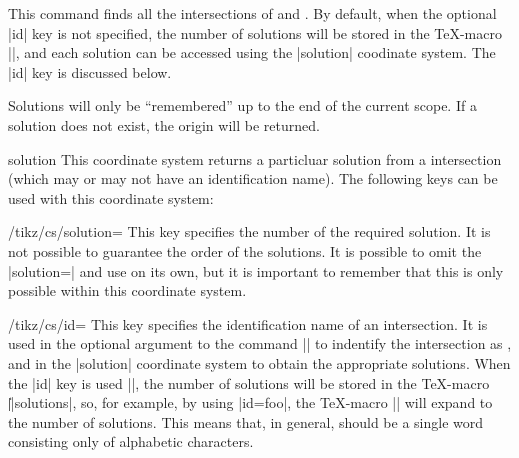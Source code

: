 \begin{command}{\tikzintersectnamedpaths\opt{|[id=|\meta{name}|]|}}
  
  This command finds all the intersections of  and 
  . By default, when the optional |id| key is not 
  specified, the number of solutions will be stored in the 
  \TeX-macro |\solutions|, and each solution can be accessed 
  using the |solution| coodinate system. The |id| key is
  discussed below.
  
  Solutions will only be ``remembered'' up to the end of the current
  scope. If a solution does not exist, the origin will be
  returned. 
  
\begin{coordinatesystem}{solution}
  This coordinate system returns a particluar solution from 
  a intersection (which may or may not have an identification 
  name). The following keys can be used with this coordinate
  system:

\begin{key}{/tikz/cs/solution=}
  This key specifies the number of the required solution. It is not
  possible to guarantee the order of the solutions. It is possible
  to omit the |solution=| and use  on its own, but it
  is important to remember that this is only possible within this
  coordinate system.

\begin{codeexample}[]
\end{codeexample}
\end{key}

\begin{key}{/tikz/cs/id=}
  This key specifies the identification name of an intersection.
  It is used in the optional argument to the command 
  |\tikzintersectnamedpaths| to indentify the intersection as 
  , and in the |solution| coordinate system to obtain 
  the appropriate solutions.
  When the |id| key is used |\tikzintersectnamedpaths|, the number 
  of solutions will be stored in the \TeX-macro 
  |\||solutions|, so, for example, by 
  using |id=foo|, the \TeX-macro |\foosolutions|  will expand to the 
  number of solutions. This means that, in general,  
  should be a single word consisting only of alphabetic characters.
\end{key}


\end{coordinatesystem}
\end{command}
